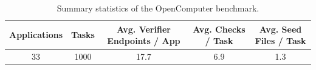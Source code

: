\begin{table}[t]
\centering
\small
\caption{Summary statistics of the OpenComputer benchmark.}
\begin{tabular}{c c c c c}
\toprule
\textbf{Applications} &
\textbf{Tasks} &
\textbf{Avg. Verifier Endpoints / App} &
\textbf{Avg. Checks / Task} &
\textbf{Avg. Seed Files / Task} \\
\midrule
33 & 1000 & 17.7 & 6.9 & 1.3 \\
\bottomrule
\end{tabular}
\label{tab:data_statistics}
\end{table}